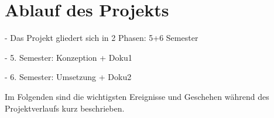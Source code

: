 \section{Ablauf des Projekts}

- Das Projekt gliedert sich in 2 Phasen: 5+6 Semester

- 5. Semester: Konzeption + Doku1

- 6. Semester: Umsetzung  + Doku2

Im Folgenden sind die wichtigsten Ereignisse und Geschehen während des Projektverlaufs kurz beschrieben.

